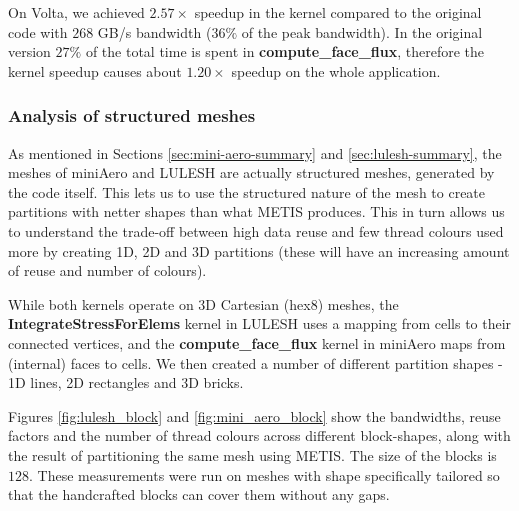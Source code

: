 On Volta, we achieved $2.57\times$ speedup in the kernel compared to the
original code with $268$ GB/s bandwidth ($36\%$ of the peak bandwidth). In the
original version $27\%$ of the total time is spent in
\textbf{compute\_face\_flux}, therefore the kernel speedup causes about
$1.20\times$ speedup on the whole application.


\subsubsection{Analysis of structured meshes}

As mentioned in Sections \ref{sec:mini-aero-summary} and
\ref{sec:lulesh-summary}, the meshes of miniAero and LULESH are actually structured meshes, generated by the
code itself. This lets us to use the structured nature of the mesh to create partitions with netter shapes than what METIS produces. This in turn allows us to understand the trade-off between
high data reuse and few thread colours used more by creating 1D, 2D and 3D
partitions (these will have an increasing amount of reuse and number of colours).

While both kernels operate on 3D Cartesian (hex8) meshes, the
\textbf{IntegrateStressForElems} kernel in LULESH uses a mapping from cells to their
connected vertices, and the \textbf{compute\_face\_flux} kernel in miniAero maps from
(internal) faces to cells. We then created a number of different partition shapes - 1D lines, 2D rectangles and 3D bricks.


Figures \ref{fig:lulesh_block} and \ref{fig:mini_aero_block} show the
bandwidths, reuse factors and the number of thread colours across different
block-shapes, along with the result of partitioning the same mesh using METIS.
The size of the blocks is $128$. These measurements were run on meshes with
shape specifically tailored so that the handcrafted blocks can cover them
without any gaps.

